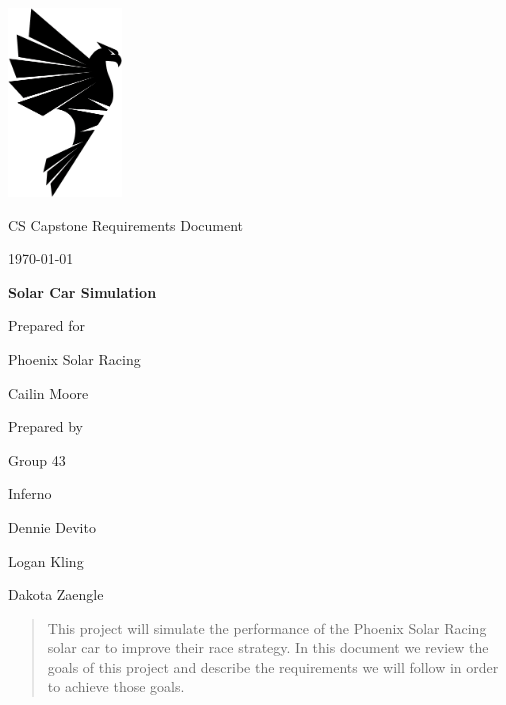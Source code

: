 \documentclass[onecolumn, draftclsnofoot,10pt, compsoc]{IEEEtran}
\def \CapstoneTeamName{		Inferno}
\def \CapstoneTeamNumber{		43}
\def \GroupMemberOne{			Dennie Devito}
\def \GroupMemberTwo{			Logan Kling}
\def \GroupMemberThree{			Dakota Zaengle}
\def \CapstoneProjectName{		Solar Car Simulation}
\def \CapstoneSponsorCompany{	Phoenix Solar Racing}
\def \CapstoneSponsorPerson{		Cailin Moore}
\def \DocType{		%
				Requirements Document
				}
\newcommand{\NameSigPair}[1]{\par
\makebox[2.75in][r]{#1} \hfil 	\makebox[3.25in]{\makebox[2.25in]{\hrulefill} \hfill		\makebox[.75in]{\hrulefill}}
\par\vspace{-12pt} \textit{\tiny\noindent
\makebox[2.75in]{} \hfil		\makebox[3.25in]{\makebox[2.25in][r]{Signature} \hfill	\makebox[.75in][r]{Date}}}}
\renewcommand{\NameSigPair}[1]{#1}
\begin{document}
\begin{titlepage}
    \begin{singlespace}
        \hfill
        \begin{flushleft}
        \includegraphics[height=5cm]{Shirt_Graphic.png}
        \end{flushleft}
        \par\vspace{.2in}
        \centering
        \scshape{
            \huge CS Capstone \DocType \par
            {\large\today}\par
            \vspace{.5in}
            \textbf{\Huge\CapstoneProjectName}\par
            \vfill
            {\large Prepared for}\par
            \Huge \CapstoneSponsorCompany\par
            \vspace{5pt}
            {\Large\NameSigPair{\CapstoneSponsorPerson}\par}
            {\large Prepared by }\par
            Group\CapstoneTeamNumber\par
            \CapstoneTeamName\par 
            \vspace{5pt}
            {\Large
                \NameSigPair{\GroupMemberOne}\par
                \NameSigPair{\GroupMemberTwo}\par
                \NameSigPair{\GroupMemberThree}\par
            }
            \vspace{20pt}
        }
        \begin{abstract}
        This project will simulate the performance of the Phoenix Solar Racing solar car to improve their race strategy. In this document we review the goals of this project and describe the requirements we will follow in order to achieve those goals. 
        	

        \end{abstract}     
    \end{singlespace}
\end{titlepage}
\newpage
{}
\tableofcontents
\clearpage
\end{document}
